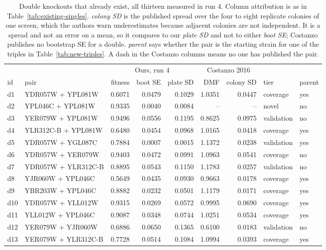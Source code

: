 \begin{table}[H]\centering
\footnotesize
\caption[]{Double knockouts that already exist, all thirteen measured in run 4. Column attribution is as in Table~\ref{tab:existing-singles}. \emph{colony SD} is the published spread over the four to eight replicate colonies of one screen, which the authors warn underestimates because adjacent colonies are not independent. It is a spread and not an error on a mean, so it compares to our \emph{plate SD} and not to either \emph{boot SE}; Costanzo publishes no bootstrap SE for a double. \emph{parent} says whether the pair is the starting strain for one of the triples in Table~\ref{tab:new-triples}. A dash in the Costanzo columns means no one has published the pair.}\label{tab:existing-doubles}
\begin{tabular}{llrrrrrll}
\toprule
& & \multicolumn{3}{c}{Ours, run 4} & \multicolumn{2}{c}{Costanzo 2016} & & \\
\cmidrule(lr){3-5}\cmidrule(lr){6-7}
id & pair & fitness & boot SE & plate SD & DMF & colony SD & tier & parent \\
\midrule
d1 & YDR057W + YPL081W & 0.6071 & 0.0479 & 0.1029 & 1.0351 & 0.0447 & coverage & yes \\
d2 & YPL046C + YPL081W & 0.9335 & 0.0040 & 0.0084 & -- & -- & novel & no \\
d3 & YER079W + YPL081W & 0.9496 & 0.0556 & 0.1195 & 0.8625 & 0.0975 & validation & no \\
d4 & YLR312C-B + YPL081W & 0.6480 & 0.0454 & 0.0968 & 1.0165 & 0.0418 & coverage & yes \\
d5 & YDR057W + YGL087C & 0.7884 & 0.0007 & 0.0015 & 1.1372 & 0.0238 & validation & yes \\
d6 & YDR057W + YER079W & 0.9403 & 0.0472 & 0.0991 & 1.0963 & 0.0541 & coverage & no \\
d7 & YDR057W + YLR312C-B & 0.8895 & 0.0543 & 0.1150 & 1.1783 & 0.0257 & validation & no \\
d8 & YJR060W + YPL046C & 0.5649 & 0.0435 & 0.0930 & 0.9663 & 0.0178 & coverage & yes \\
d9 & YBR203W + YPL046C & 0.8882 & 0.0232 & 0.0501 & 1.1179 & 0.0171 & coverage & yes \\
d10 & YDR057W + YLL012W & 0.9315 & 0.0269 & 0.0572 & 0.9995 & 0.0690 & coverage & yes \\
d11 & YLL012W + YPL046C & 0.9087 & 0.0348 & 0.0744 & 1.0251 & 0.0534 & coverage & yes \\
d12 & YER079W + YJR060W & 0.6886 & 0.0650 & 0.1365 & 0.6100 & 0.0183 & validation & no \\
d13 & YER079W + YLR312C-B & 0.7728 & 0.0514 & 0.1084 & 1.0994 & 0.0393 & coverage & yes \\
\bottomrule
\end{tabular}
\end{table}
